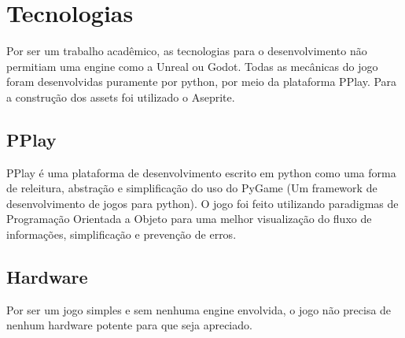 \documentclass[a4paper]{scrreprt}
\begin{document}






\chapter{Tecnologias}
Por ser um trabalho acadêmico, as tecnologias para o desenvolvimento não permitiam uma engine como a Unreal ou Godot. Todas as mecânicas do jogo foram desenvolvidas puramente por python, por meio da plataforma PPlay. Para a construção dos assets foi utilizado o Aseprite.
\section{PPlay}
PPlay é uma plataforma de desenvolvimento escrito em python como uma forma de releitura, abstração e simplificação do uso do PyGame (Um framework de desenvolvimento de jogos para python). O jogo foi feito utilizando paradigmas de Programação Orientada a Objeto para uma melhor visualização do fluxo de informações, simplificação e prevenção de erros.


\section{Hardware}
Por ser um jogo simples e sem nenhuma engine envolvida, o jogo não precisa de nenhum hardware potente para que seja apreciado.





\end{document}
